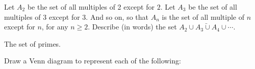 \begin{questions}
  \begin{answer}
  \end{answer}



\question Let $A_2$ be the set of all multiples of 2 except for $2$.  Let $A_3$ be the set of all multiples of 3 except for 3.  And so on, so that $A_n$ is the set of all multiple of $n$ except for $n$, for any $n \ge 2$.  Describe (in words) the set $\bar{A_2 \cup A_3 \cup A_4 \cup \cdots}$.

  \begin{answer}
    The set of primes.
  \end{answer}




\question Draw a Venn diagram to represent each of the following:
\end{questions}
